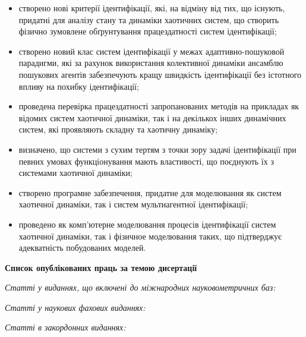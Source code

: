 \documentclass[a4paper,13pt]{atuaref}
\newcommand{\xsect}[1]{\medskip\begin{center}\textbf{#1}\end{center}\medskip\penalty10000}
\newcommand{\xxxsect}[1]{\smallskip\textit{#1}\smallskip\penalty10000}
\begin{document}
\begin{itemize}

  \item
    створено нові критерії ідентифікації, які, на відміну від тих, що
    існують, придатні для аналізу стану та динаміки
    хаотичних систем, що створить фізично зумовлене обґрунтування працездатності систем
    ідентифікації;

  \item
    створено новий клас систем ідентифікації у межах
    адаптивно-пошуковой парадигми,
    які за рахунок використання колективної динаміки
    ансамблю пошукових агентів забезпечують
    кращу швидкість ідентифікації без істотного впливу на похибку ідентифікації;

  \item
    проведена перевірка працездатності запропанованих методів
    на прикладах як відомих систем хаотичної динаміки,
    так і на декількох інших динамічних систем, які проявляють
    складну та хаотичну динаміку;

  \item
   визначено, що системи з сухим тертям з точки зору задачі ідентифікації
   при певних  умовах функціонування
   мають властивості, що поєднують їх з системами хаотичної динаміки;

 \item
  створено програмне забезпечення, придатне для моделювання як систем
  хаотичної динаміки, так і систем мультиагентної ідентифікації;

  \item
  проведено як комп'ютерне моделювання процесів ідентифікації систем
  хаотичної динаміки, так і фізичное моделювання таких, що підтверджує адекватність
  побудованих моделей.


\end{itemize}



\nocite{*}

\xsect{Список опублікованих праць за темою дисертації}

\xxxsect{Статті у виданнях, що включені до міжнародних науковометричних баз:}

\printbibliography[heading=none, keyword=scimetr]


\xxxsect{Статті у наукових фахових виданнях:}

\printbibliography[heading=none, keyword=vak]

\xxxsect{Статті в закордонних виданнях:}

\printbibliography[heading=none, keyword=foreign]
\end{document}
